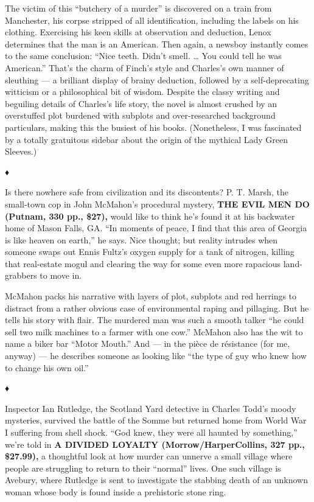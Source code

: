 The victim of this ``butchery of a murder'' is discovered on a train
from Manchester, his corpse stripped of all identification, including
the labels on his clothing. Exercising his keen skills at observation
and deduction, Lenox determines that the man is an American. Then again,
a newsboy instantly comes to the same conclusion: ``Nice teeth. Didn't
smell. \ldots{} You could tell he was American.'' That's the charm of
Finch's style and Charles's own manner of sleuthing --- a brilliant
display of brainy deduction, followed by a self-deprecating witticism or
a philosophical bit of wisdom. Despite the classy writing and beguiling
details of Charles's life story, the novel is almost crushed by an
overstuffed plot burdened with subplots and over-researched background
particulars, making this the busiest of his books. (Nonetheless, I was
fascinated by a totally gratuitous sidebar about the origin of the
mythical Lady Green Sleeves.)

\textbf{♦}

Is there nowhere safe from civilization and its discontents? P. T.
Marsh, the small-town cop in John McMahon's procedural mystery,
\textbf{THE EVIL MEN DO (Putnam, 330 pp., \$27),} would like to think
he's found it at his backwater home of Mason Falls, GA. ``In moments of
peace, I find that this area of Georgia is like heaven on earth,'' he
says. Nice thought; but reality intrudes when someone swaps out Ennis
Fultz's oxygen supply for a tank of nitrogen, killing that real-estate
mogul and clearing the way for some even more rapacious land-grabbers to
move in.

McMahon packs his narrative with layers of plot, subplots and red
herrings to distract from a rather obvious case of environmental raping
and pillaging. But he tells his story with flair. The murdered man was
such a smooth talker ``he could sell two milk machines to a farmer with
one cow.'' McMahon also has the wit to name a biker bar ``Motor Mouth.''
And --- in the pièce de résistance (for me, anyway) --- he describes
someone as looking like ``the type of guy who knew how to change his own
oil.''

♦

Inspector Ian Rutledge, the Scotland Yard detective in Charles Todd's
moody mysteries, survived the battle of the Somme but returned home from
World War I suffering from shell shock. ``God knew, they were all
haunted by something,'' we're told in \textbf{A DIVIDED LOYALTY
(Morrow/HarperCollins, 327 pp., \$27.99),} a thoughtful look at how
murder can unnerve a small village where people are struggling to return
to their ``normal'' lives. One such village is Avebury, where Rutledge
is sent to investigate the stabbing death of an unknown woman whose body
is found inside a prehistoric stone ring.

